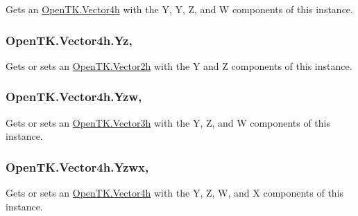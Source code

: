 Gets an \hyperlink{struct_open_t_k_1_1_vector4h}{Open\-T\-K.\-Vector4h} with the Y, Y, Z, and W components of this instance. 

\hypertarget{struct_open_t_k_1_1_vector4h_a9a87c6d679af481e4cd49f651808a506}{
\subsubsection[{Yz}]{ Open\-T\-K.\-Vector4h.\-Yz\hspace{0.3cm}{\ttfamily [get]}, {\ttfamily [set]}}}\label{struct_open_t_k_1_1_vector4h_a9a87c6d679af481e4cd49f651808a506}


Gets or sets an \hyperlink{struct_open_t_k_1_1_vector2h}{Open\-T\-K.\-Vector2h} with the Y and Z components of this instance. 

\hypertarget{struct_open_t_k_1_1_vector4h_ad18605f12dd6c1988a40b93128e2284b}{
\subsubsection[{Yzw}]{ Open\-T\-K.\-Vector4h.\-Yzw\hspace{0.3cm}{\ttfamily [get]}, {\ttfamily [set]}}}\label{struct_open_t_k_1_1_vector4h_ad18605f12dd6c1988a40b93128e2284b}


Gets or sets an \hyperlink{struct_open_t_k_1_1_vector3h}{Open\-T\-K.\-Vector3h} with the Y, Z, and W components of this instance. 

\hypertarget{struct_open_t_k_1_1_vector4h_a10804c2b72ac7c3586afc810f86e9651}{
\subsubsection[{Yzwx}]{ Open\-T\-K.\-Vector4h.\-Yzwx\hspace{0.3cm}{\ttfamily [get]}, {\ttfamily [set]}}}\label{struct_open_t_k_1_1_vector4h_a10804c2b72ac7c3586afc810f86e9651}


Gets or sets an \hyperlink{struct_open_t_k_1_1_vector4h}{Open\-T\-K.\-Vector4h} with the Y, Z, W, and X components of this instance. 

